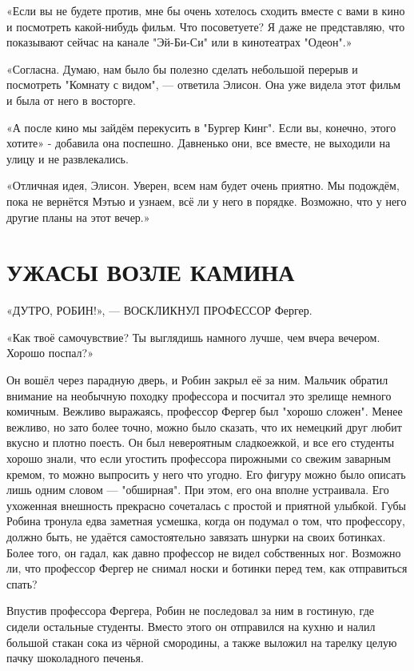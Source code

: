 \documentclass[a5paper, 9pt,
final, openany, twoside=true]{memoir}
\begin{document}
«Если вы не будете против, мне бы очень хотелось сходить вместе с вами в кино и посмотреть какой-нибудь фильм. Что посоветуете? Я даже не представляю, что показывают сейчас на канале "Эй-Би-Си" или в кинотеатрах "Одеон".»

«Согласна. Думаю, нам было бы полезно сделать небольшой перерыв и посмотреть "Комнату с видом", — ответила Элисон. Она уже видела этот фильм и была от него в восторге.

«А после кино мы зайдём перекусить в "Бургер Кинг". Если вы, конечно, этого хотите» - добавила она поспешно. Давненько они, все вместе, не выходили на улицу и не развлекались.

«Отличная идея, Элисон. Уверен, всем нам будет очень приятно. Мы подождём, пока не вернётся Мэтью и узнаем, всё ли у него в порядке. Возможно, что у него другие планы на этот вечер.»
\chapter{УЖАСЫ ВОЗЛЕ КАМИНА}
«Д{ УТРО, РОБИН!», — ВОСКЛИКНУЛ ПРОФЕССОР} Фергер.

«Как твоё самочувствие? Ты выглядишь намного лучше, чем вчера вечером. Хорошо поспал?»

Он вошёл через парадную дверь, и Робин закрыл её за ним. Мальчик обратил внимание на необычную походку профессора и посчитал это зрелище немного комичным. Вежливо выражаясь, профессор Фергер был "хорошо сложен". Менее вежливо, но зато более точно, можно было сказать, что их немецкий друг любит вкусно и плотно поесть. Он был невероятным сладкоежкой, и все его студенты хорошо знали, что если угостить профессора пирожными со свежим заварным кремом, то можно выпросить у него что угодно. Его фигуру можно было описать лишь одним словом — "обширная". При этом, его она вполне устраивала. Его ухоженная внешность прекрасно сочеталась с простой и приятной улыбкой. Губы Робина тронула едва заметная усмешка, когда он подумал о том, что профессору, должно быть, не удаётся самостоятельно завязать шнурки на своих ботинках. Более того, он гадал, как давно профессор не видел собственных ног. Возможно ли, что профессор Фергер не снимал носки и ботинки перед тем, как отправиться спать?\bigskip

Впустив профессора Фергера, Робин не последовал за ним в гостиную, где сидели остальные студенты. Вместо этого он отправился на кухню и налил большой стакан сока из чёрной смородины, а также выложил на тарелку целую пачку шоколадного печенья.
\end{document}
